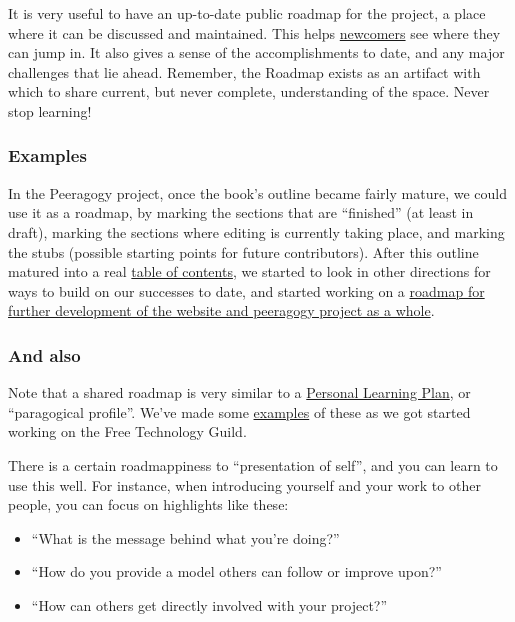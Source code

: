 It is very useful to have an up-to-date public roadmap for the project,
a place where it can be discussed and maintained. This helps
\href{http://peeragogy.org/practice/heuristics/newcomer/}{newcomers} see
where they can jump in. It also gives a sense of the accomplishments to
date, and any major challenges that lie ahead. Remember, the Roadmap
exists as an artifact with which to share current, but never complete,
understanding of the space. Never stop learning!

\subsubsection{Examples}

In the Peeragogy project, once the book's outline became fairly mature,
we could use it as a roadmap, by marking the sections that are
``finished'' (at least in draft), marking the sections where editing is
currently taking place, and marking the stubs (possible starting points
for future contributors). After this outline matured into a real
\href{http://peeragogy.org/table-of-contents/}{table of contents}, we
started to look in other directions for ways to build on our successes
to date, and started working on a
\href{http://peeragogy.org/peeragogy-org-roadmap/}{roadmap for further
development of the website and peeragogy project as a whole}.

\subsubsection{And also}

Note that a shared roadmap is very similar to a
\href{http://peeragogy.org/to-peeragogy/personal-learning-plan/}{Personal
Learning Plan}, or ``paragogical profile''. We've made some
\href{http://campus.ftacademy.org/wiki/index.php/Free\_Technology\_Guild\#Learning\_design}{examples}
of these as we got started working on the Free Technology Guild.

There is a certain roadmappiness to ``presentation of self'', and you
can learn to use this well. For instance, when introducing yourself and
your work to other people, you can focus on highlights like these:

\begin{itemize}
\item
  ``What is the message behind what you're doing?''
\item
  ``How do you provide a model others can follow or improve upon?''
\item
  ``How can others get directly involved with your project?''
\end{itemize}
